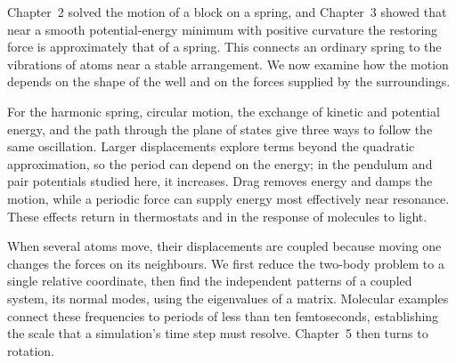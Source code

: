 Chapter~2 solved the motion of a block on a spring, and Chapter~3 showed
that near a smooth potential-energy minimum with positive curvature the
restoring force is approximately that of a spring. This connects an
ordinary spring to the vibrations of atoms near a stable arrangement.
We now examine how the motion depends on the shape of the well and on
the forces supplied by the surroundings.

For the harmonic spring, circular motion, the exchange of kinetic and
potential energy, and the path through the plane of states give three
ways to follow the same oscillation. Larger displacements explore terms
beyond the quadratic approximation, so the period can depend on the
energy; in the pendulum and pair potentials studied here, it increases.
Drag removes energy and damps the motion, while a periodic force can
supply energy most effectively near resonance. These effects return in
thermostats and in the response of molecules to light.

When several atoms move, their displacements are coupled because moving
one changes the forces on its neighbours. We first reduce the two-body
problem to a single relative coordinate, then find the independent
patterns of a coupled system, its normal modes, using the eigenvalues
of a matrix. Molecular examples connect these frequencies to periods of
less than ten femtoseconds, establishing the scale that a simulation's
time step must resolve. Chapter~5 then turns to rotation.
